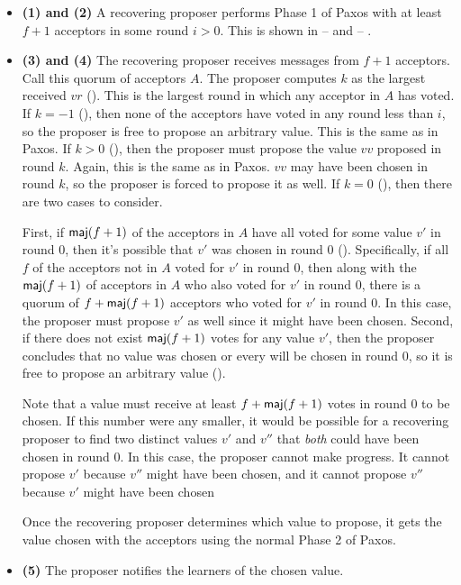 \begin{itemize}
  \item \textbf{(1) and (2)}
    A recovering proposer performs Phase 1 of Paxos with at least $f+1$
    acceptors in some round $i > 0$. This is shown in
      --
     and 
     -- .

  \item \textbf{(3) and (4)}
    The recovering proposer receives  messages from
    $f+1$ acceptors. Call this quorum of acceptors $A$. The proposer computes
    $k$ as the largest received $vr$ (). This is the largest
    round in which any acceptor in $A$ has voted. If $k = -1$ (),
    then none of the acceptors have voted in any round less than $i$, so the
    proposer is free to propose an arbitrary value. This is the same as in
    Paxos. If $k > 0$ (), then the proposer must propose the value
    $vv$ proposed in round $k$. Again, this is the same as in Paxos. $vv$ may
    have been chosen in round $k$, so the proposer is forced to propose it as
    well. If $k = 0$ (), then there are two cases to consider.

    First, if $\textsf{maj}(f+1)$ of the acceptors in $A$ have all voted for some value
    $v'$ in round $0$, then it's possible that $v'$ was chosen in round $0$
    (). Specifically, if all $f$ of the acceptors not in $A$
    voted for $v'$ in round $0$, then along with the $\textsf{maj}(f+1)$ of acceptors in
    $A$ who also voted for $v'$ in round $0$, there is a quorum of $f +
    \textsf{maj}(f+1)$ acceptors who voted for $v'$ in round $0$. In this case, the
    proposer must propose $v'$ as well since it might have been chosen. Second,
    if there does not exist $\textsf{maj}(f+1)$ votes for any value $v'$, then the
    proposer concludes that no value was chosen or every will be chosen in
    round $0$, so it is free to propose an arbitrary value
    ().

    Note that a value must receive at least $f + \textsf{maj}(f+1)$ votes in round $0$
    to be chosen. If this number were any smaller, it would be possible for a
    recovering proposer to find two distinct values $v'$ and $v''$ that
    \emph{both} could have been chosen in round $0$. In this case, the proposer
    cannot make progress. It cannot propose $v'$ because $v''$ might have been
    chosen, and it cannot propose $v''$ because $v'$ might have been chosen

    Once the recovering proposer determines which value to propose, it gets the
    value chosen with the acceptors using the normal Phase 2 of Paxos.

  \item \textbf{(5)}
    The proposer notifies the learners of the chosen value.
\end{itemize}


